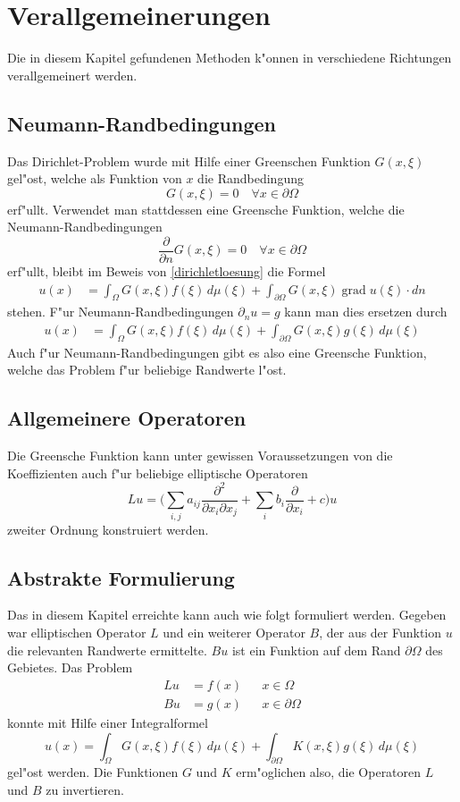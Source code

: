 \section{Verallgemeinerungen}
Die in diesem Kapitel gefundenen Methoden k"onnen in verschiedene Richtungen
verallgemeinert werden.
\subsection{Neumann-Randbedingungen}
Das Dirichlet-Problem wurde mit Hilfe einer Greenschen Funktion $G(x,\xi)$
gel"ost, welche als Funktion von $x$ die Randbedingung
\[
G(x,\xi)=0\quad\forall x\in\partial\Omega
\]
erf"ullt.
Verwendet man stattdessen eine Greensche Funktion, welche die
Neumann-Randbedingungen
\[
\frac{\partial}{\partial n}G(x,\xi)=0\quad\forall x\in\partial\Omega
\]
erf"ullt, bleibt im Beweis von \ref{dirichletloesung}
die Formel
\begin{align*}
u(x)&=\int_{\Omega}G(x,\xi)f(\xi)\,d\mu(\xi)+\int_{\partial\Omega}G(x,\xi)\operatorname{grad}u(\xi)\cdot dn
\end{align*}
stehen. F"ur Neumann-Randbedingungen $\partial_n u=g$ kann man dies ersetzen
durch
\begin{align*}
u(x)&=\int_{\Omega}G(x,\xi)f(\xi)\,d\mu(\xi)+\int_{\partial\Omega}G(x,\xi)g(\xi)\,d\mu(\xi)
\end{align*}
Auch f"ur Neumann-Randbedingungen gibt es also eine Greensche Funktion, welche
das Problem f"ur beliebige Randwerte l"ost.

\subsection{Allgemeinere Operatoren}
Die Greensche Funktion kann unter gewissen Voraussetzungen
von die Koeffizienten auch f"ur beliebige elliptische Operatoren
\[
Lu=\biggl(\sum_{i,j}a_{ij}\frac{\partial^2}{\partial x_i\partial x_j}
+\sum_ib_i\frac{\partial}{\partial x_i} +c\biggr)u
\]
zweiter Ordnung konstruiert werden.

\subsection{Abstrakte Formulierung}
Das in diesem Kapitel erreichte kann auch wie folgt formuliert werden.
Gegeben war elliptischen Operator $L$ und ein weiterer Operator $B$,
der aus der Funktion $u$ die relevanten Randwerte ermittelte. $Bu$
ist ein Funktion auf dem Rand $\partial \Omega$ des Gebietes. 
Das Problem
\begin{align*}
Lu&=f(x)&&x\in\Omega
\\
Bu&=g(x)&&x\in\partial\Omega
\end{align*}
konnte mit Hilfe einer Integralformel
\[
u(x)=\int_\Omega G(x,\xi)f(\xi)\,d\mu(\xi)+\int_{\partial \Omega}K(x,\xi)g(\xi)\,d\mu(\xi)
\]
gel"ost werden.
Die Funktionen $G$ und $K$ erm"oglichen also, die Operatoren $L$ und $B$
zu invertieren.

